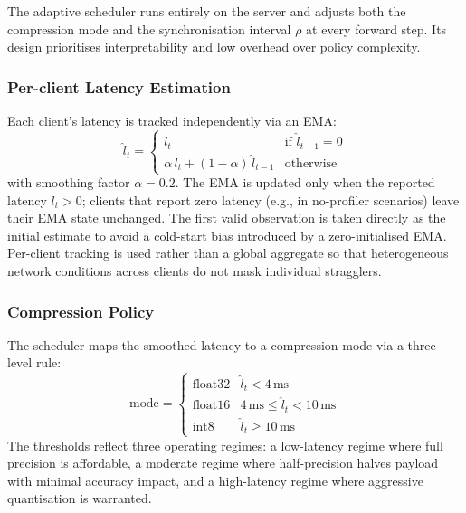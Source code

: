 \documentclass[conference]{IEEEtran}
\begin{document}
The adaptive scheduler runs entirely on the server and adjusts both the compression mode and the synchronisation interval $\rho$ at every forward step. Its design prioritises interpretability and low overhead over policy complexity.

\subsubsection{Per-client Latency Estimation}
Each client's latency is tracked independently via an EMA:
\begin{equation}
    \hat{l}_t =
    \begin{cases}
        l_t & \text{if } \hat{l}_{t-1} = 0 \\[4pt]
        \alpha\,l_t + (1-\alpha)\,\hat{l}_{t-1} & \text{otherwise}
    \end{cases}
    \label{eq:ema}
\end{equation}
with smoothing factor $\alpha = 0.2$. The EMA is updated only when the reported latency $l_t > 0$; clients that report zero latency (e.g., in no-profiler scenarios) leave their EMA state unchanged. The first valid observation is taken directly as the initial estimate to avoid a cold-start bias introduced by a zero-initialised EMA. Per-client tracking is used rather than a global aggregate so that heterogeneous network conditions across clients do not mask individual stragglers.

\subsubsection{Compression Policy}
The scheduler maps the smoothed latency to a compression mode via a
three-level rule:
\begin{equation}
    \text{mode} =
    \begin{cases}
        \text{float32} & \hat{l}_t < 4\,\text{ms} \\[2pt]
        \text{float16} & 4\,\text{ms} \leq \hat{l}_t < 10\,\text{ms} \\[2pt]
        \text{int8}    & \hat{l}_t \geq 10\,\text{ms}
    \end{cases}
    \label{eq:comp_policy}
\end{equation}
The thresholds reflect three operating regimes: a low-latency regime where full precision is affordable, a moderate regime where half-precision halves payload with minimal accuracy impact, and a high-latency regime where aggressive quantisation is warranted.
\end{document}
